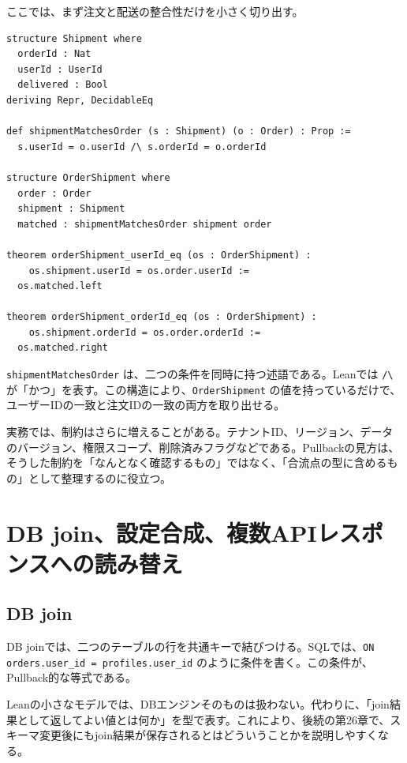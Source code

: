 ここでは、まず注文と配送の整合性だけを小さく切り出す。

\begin{listing}[htbp]
\begin{verbatim}
structure Shipment where
  orderId : Nat
  userId : UserId
  delivered : Bool
deriving Repr, DecidableEq

def shipmentMatchesOrder (s : Shipment) (o : Order) : Prop :=
  s.userId = o.userId /\ s.orderId = o.orderId

structure OrderShipment where
  order : Order
  shipment : Shipment
  matched : shipmentMatchesOrder shipment order

theorem orderShipment_userId_eq (os : OrderShipment) :
    os.shipment.userId = os.order.userId :=
  os.matched.left

theorem orderShipment_orderId_eq (os : OrderShipment) :
    os.shipment.orderId = os.order.orderId :=
  os.matched.right
\end{verbatim}
\caption{注文と配送情報の整合条件}
\label{lst:ch17-order-shipment}
\end{listing}

\texttt{shipmentMatchesOrder} は、二つの条件を同時に持つ述語である。Leanでは \lstinline|/\| が「かつ」を表す。この構造により、\texttt{OrderShipment} の値を持っているだけで、ユーザーIDの一致と注文IDの一致の両方を取り出せる。


実務では、制約はさらに増えることがある。テナントID、リージョン、データのバージョン、権限スコープ、削除済みフラグなどである。Pullbackの見方は、そうした制約を「なんとなく確認するもの」ではなく、「合流点の型に含めるもの」として整理するのに役立つ。

\section{DB join、設定合成、複数APIレスポンスへの読み替え}

\subsection{DB join}

DB joinでは、二つのテーブルの行を共通キーで結びつける。SQLでは、\texttt{ON orders.user\_id = profiles.user\_id} のように条件を書く。この条件が、Pullback的な等式である。

Leanの小さなモデルでは、DBエンジンそのものは扱わない。代わりに、「join結果として返してよい値とは何か」を型で表す。これにより、後続の第26章で、スキーマ変更後にもjoin結果が保存されるとはどういうことかを説明しやすくなる。

